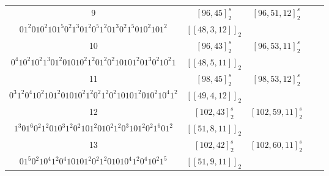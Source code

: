 \documentclass[journal]{IEEEtran}
\begin{document}
\begin{table}[!t]
\begin{tabular}{ccccc}
		 9  &  $[96,45]_2^s$  &  $[96,51,12]_2^s$   &                                                                                                                                                      \makecell[c]{$1^2,010^{2}10^{9}1^{2}01010^{2}1^{2}01^{2}0^{2}10101^{2}0^{9}10^{2}1$,\\$01^{2}010^{2}101^{5}0^{2}1^{3}01^{2}0^{5}1^{2}01^{3}0^{2}1^{5}010^{2}101^2$}                                                                                                                                                      & $[[48,3,12]]_2$  \\
		 10  &  $[96,43]_2^s$  &  $[96, 53,11]_2^s$  &                                                                                                                                                       \makecell[c]{$1^2,0^{4}1^{3}0101^{3}01^{7}01^{2}01^{2}01^{7}01^{3}0101^3$,\\$0^{4}10^{2}10^{2}1^{3}01^{2}01010^{2}1^{2}01^{2}0^{2}10101^{2}01^{3}0^{2}10^{2}1$  }                                                                                                                                                       & $[[48,5,11]]_2$  \\
		11  & $[98, 45]_2^s$  &  $[98, 53,12]_2^s$  &                                                                                                                                       \makecell[c]{$101^2,010^{2}1^{2}0^{2}1^{2}010^{2}10^{6}1^{2}0^{4}1^{2}0^{6}10^{2}101^{2}0^{2}1^{2}0^{2}1$,\\$0^{3}1^{2}0^{4}10^{2}101^{2}01010^{2}1^{2}0^{2}1^{2}0^{2}10101^{2}010^{2}10^{4}1^2$}                                                                                                                                       & $[[49,4,12]]_2$  \\
		12  & $[102, 43]_2^s$ & $[102, 59,11]_2^s$  &                                                                                                                                     \makecell[c]{$10^{3}1^{2}01^2,1^{2}0101^{3}01^{2}0^{4}10^{3}1^{2}0101^{4}0101^{2}0^{3}10^{4}1^{2}01^{3}0101$,\\$1^{3}01^{6}0^{2}1^{2}010^{3}1^{2}0^{2}101^{2}010^{2}1^{2}0^{3}101^{2}0^{2}1^{6}01^2$}                                                                                                                                     & $[[51,8,11]]_2$  \\
		13  & $[102, 42]_2^s$ & $[102, 60,11]_2^s$  &                                                                                                                                            \makecell[c]{$10^{3}1^{2}01^2,0^{2}1010^{3}1^{7}01^{2}01^{3}0^{2}10^{2}10^{2}1^{3}01^{2}01^{7}0^{3}101$,\\$01^{5}0^{2}10^{4}1^{2}0^{4}10101^{2}0^{2}1^{2}01010^{4}1^{2}0^{4}10^{2}1^5$}                                                                                                                                            & $[[51,9,11]]_2$  \\

\end{tabular}
\end{table}
\end{document}
